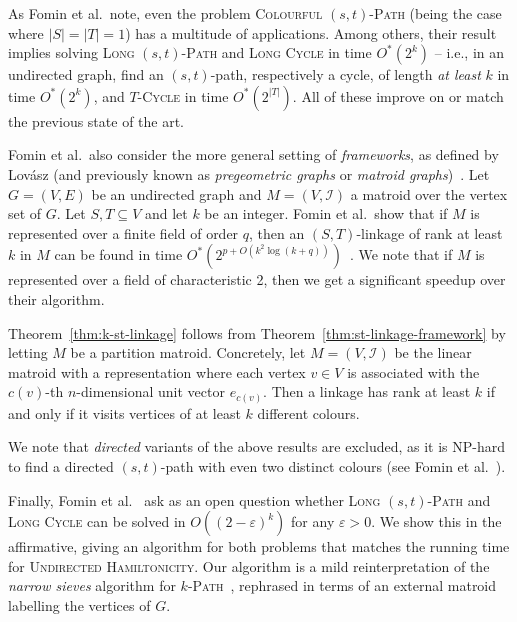 \documentclass{theoretics}
\makeatletter
\newcommand{\cI}{\ensuremath{\mathcal I}\xspace}
\newcommand\IfRestateTF{%
  \ifx\label\thmt@gobble@label %
    \expandafter\@firstoftwo
  \else
    \expandafter\@secondoftwo
  \fi
}
\newcommand{\RestateRemark}{\IfRestateTF{{\normalfont\bfseries (Restated) }}{}}
\makeatother
\begin{document}
As Fomin et al.\ note, even the problem \textsc{Colourful $(s,t)$-Path}
(being the case where $|S|=|T|=1$) has a multitude of applications.
Among others, their result implies solving \textsc{Long $(s,t)$-Path} and
\textsc{Long Cycle} in time $O^*(2^k)$ -- i.e., in an undirected
graph, find an $(s,t)$-path, respectively a cycle, of length \emph{at least} 
$k$ in time $O^*(2^k)$, and \textsc{$T$-Cycle} in time $O^*(2^{|T|})$.
All of these improve on or match the previous state of the art.

Fomin et al.\ also consider the more general setting of \emph{frameworks},
as defined by Lov\'asz (and previously known as
\emph{pregeometric graphs} or \emph{matroid graphs})~\cite{FominGKSS24,Lovasz1977,LovaszGeomBook2019}.
Let $G=(V,E)$ be an undirected graph and $M=(V,\cI)$ a matroid over
the vertex set of $G$. Let $S, T \subseteq V$ and let $k$ be an integer. 
Fomin et al.\ show that if $M$ is represented over a finite field of order $q$, 
then an $(S,T)$-linkage of rank at least $k$ in $M$ can be found in
time $O^*(2^{p+O(k^2 \log (k+q))})$~\cite{FominGKSS24}.
We note that if $M$ is represented over a field of characteristic 2,
then we get a significant speedup over their algorithm.


Theorem~\ref{thm:k-st-linkage} follows from
Theorem~\ref{thm:st-linkage-framework} by letting $M$ be a partition matroid.
Concretely, let $M=(V, \cI)$ be the linear matroid with a
representation where each vertex $v \in V$ is associated with the
$c(v)$-th $n$-dimensional unit vector $e_{c(v)}$.
Then a linkage has rank at least $k$ if and only if it visits vertices
of at least $k$ different colours.

We note that \emph{directed} variants of the above results are
excluded, as it is NP-hard to find a directed $(s,t)$-path with even two
distinct colours (see Fomin et al.~\cite{FominGKSS24}).

Finally, Fomin et al.~\cite{FominGKSS24} ask as an open question
whether \textsc{Long $(s,t)$-Path} and \textsc{Long Cycle} can
be solved in $O((2-\varepsilon)^k)$ for any $\varepsilon > 0$.
We show this in the affirmative, giving an algorithm for both problems
that matches the running time for \textsc{Undirected Hamiltonicity}.
Our algorithm is a mild reinterpretation of the \emph{narrow sieves}
algorithm for \textsc{$k$-Path}~\cite{BjorklundHKK17narrow}, rephrased
in terms of an external matroid labelling the vertices of $G$.
\end{document}
